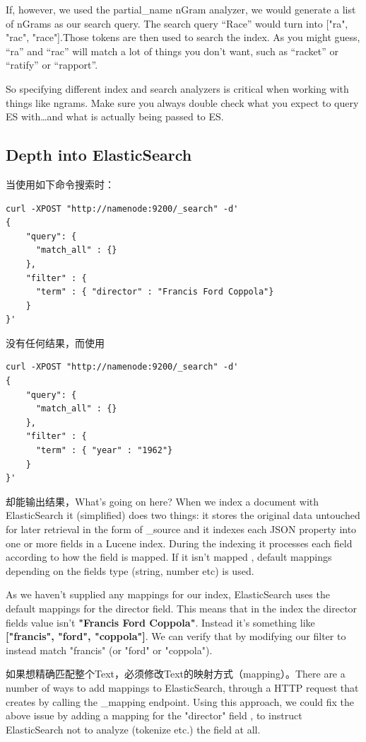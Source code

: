\par If, however, we used the partial\_name nGram analyzer, we would generate a list of nGrams as our search query. The search query “Race” would turn into ["ra", "rac", "race"].Those tokens are then used to search the index. As you might guess, “ra” and “rac” will match a lot of things you don’t want, such as “racket” or “ratify” or “rapport”.
\par So specifying different index and search analyzers is critical when working with things like ngrams. Make sure you always double check what you expect to query ES with…and what is actually being passed to ES.
\subsection{Depth into ElasticSearch}
\par 当使用如下命令搜索时：
\begin{verbatim}
curl -XPOST "http://namenode:9200/_search" -d'
{
    "query": {
      "match_all" : {}
    },
    "filter" : {
      "term" : { "director" : "Francis Ford Coppola"}
    }
}'
\end{verbatim}
没有任何结果，而使用
\begin{verbatim}
curl -XPOST "http://namenode:9200/_search" -d'
{
    "query": {
      "match_all" : {}
    },
    "filter" : {
      "term" : { "year" : "1962"}
    }
}'
\end{verbatim}
\par 却能输出结果，What's going on here? When we index a document with ElasticSearch it (simplified) does two things: it stores the original data untouched for later retrieval in the form of \_source and it indexes each JSON property into one or more fields in a Lucene index. During the indexing it processes each field according to how the field is mapped. If it isn't mapped , default mappings depending on the fields type (string, number etc) is used.
\par As we haven't supplied any mappings for our index, ElasticSearch uses the default mappings for the director field. This means that in the index the director fields value isn't \textbf{"Francis Ford Coppola"}. Instead it's something like \textbf{["francis", "ford", "coppola"]}. We can verify that by modifying our filter to instead match "francis" (or "ford" or "coppola").
\par 如果想精确匹配整个Text，必须修改Text的映射方式（mapping）。There are a number of ways to add mappings to ElasticSearch, through a HTTP request that creates by calling the \_mapping endpoint. Using this approach, we could fix the above issue by adding a mapping for the "director" field , to instruct ElasticSearch not to analyze (tokenize etc.) the field at all.

